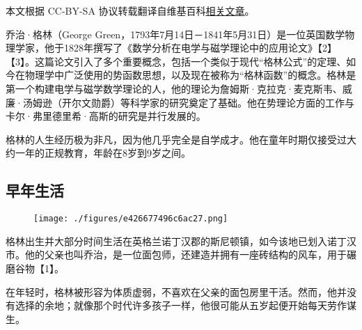
本文根据 CC-BY-SA 协议转载翻译自维基百科\href{https://en.wikipedia.org/wiki/George_Green_(mathematician)}{相关文章}。

乔治·格林（George Green，1793年7月14日－1841年5月31日）是一位英国数学物理学家，他于1828年撰写了《数学分析在电学与磁学理论中的应用论文》【2】【3】。这篇论文引入了多个重要概念，包括一个类似于现代“格林公式”的定理、如今在物理学中广泛使用的势函数思想，以及现在被称为“格林函数”的概念。格林是第一个构建电学与磁学数学理论的人，他的理论为詹姆斯·克拉克·麦克斯韦、威廉·汤姆逊（开尔文勋爵）等科学家的研究奠定了基础。他在势理论方面的工作与卡尔·弗里德里希·高斯的研究是并行发展的。

格林的人生经历极为非凡，因为他几乎完全是自学成才。他在童年时期仅接受过大约一年的正规教育，年龄在8岁到9岁之间。
\subsection{早年生活}
\begin{figure}[ht]
\centering
\texttt{[image: ./figures/e426677496c6ac27.png]}
\caption{} \label{fig_QZgl_1}
\end{figure}
格林出生并大部分时间生活在英格兰诺丁汉郡的斯尼顿镇，如今该地已划入诺丁汉市。他的父亲也叫乔治，是一位面包师，还建造并拥有一座砖结构的风车，用于碾磨谷物【1】。

在年轻时，格林被形容为体质虚弱，不喜欢在父亲的面包房里干活。然而，他并没有选择的余地；就像那个时代许多孩子一样，他很可能从五岁起便开始每天劳作谋生。
